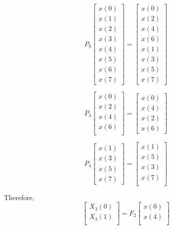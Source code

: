 \documentclass[journal,12pt,twocolumn]{IEEEtran}
\renewcommand\thesection{\arabic{section}}
\begin{document}
\begin{enumerate}[label=\thesection.\arabic*.,ref=\thesection.\theenumi]
\begin{equation}
P_{8}
\begin{bmatrix}
x(0) \\ 
x(1) \\ 
x(2) \\ 
x(3) \\ 
x(4) \\ 
x(5) \\
x(6) \\
x(7)
\end{bmatrix}
 = 
\begin{bmatrix}
x(0) \\ 
x(2) \\ 
x(4) \\ 
x(6) \\
x(1) \\ 
x(3) \\ 
x(5) \\
x(7)
\end{bmatrix}
\end{equation}

\begin{equation}
P_{4}
\begin{bmatrix}
x(0) \\ 
x(2) \\ 
x(4) \\ 
x(6) \\
\end{bmatrix}
 = 
\begin{bmatrix}
x(0) \\ 
x(4) \\ 
x(2) \\
x(6)
\end{bmatrix}
\end{equation}

\begin{equation}
P_{4}
\begin{bmatrix}
x(1) \\ 
x(3) \\ 
x(5) \\
x(7)
\end{bmatrix}
 = 
\begin{bmatrix}
x(1) \\ 
x(5) \\ 
x(3) \\ 
x(7) \\
\end{bmatrix}
\end{equation}

Therefore,
\begin{equation}
\begin{bmatrix}
X_{3}(0) \\ 
X_{3}(1)\\ 
\end{bmatrix}
= F_{2}
\begin{bmatrix}
x(0) \\ 
x(4) \\ 
\end{bmatrix}
\end{equation}


\end{enumerate}
\end{document}
